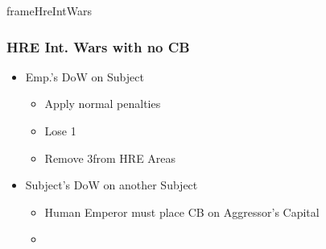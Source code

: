 \documentclass[10pt]{article}
\begin{document}
\begin{dynamiccontents*}{frameHreIntWars}
	\subsubsection*{HRE Int. Wars with no CB }
	\begin{itemize}
		\item Emp.'s DoW on Subject
		\begin{itemize}
			\item Apply normal penalties
			\item Lose 1\authority
			\item Remove 3\influence from HRE Areas
		\end{itemize}
		\item Subject's DoW on another Subject
		\begin{itemize}
			\item Human Emperor must place CB on Aggressor's Capital
			\item {}
		\end{itemize}
	\end{itemize}
\end{dynamiccontents*}
\end{document}
